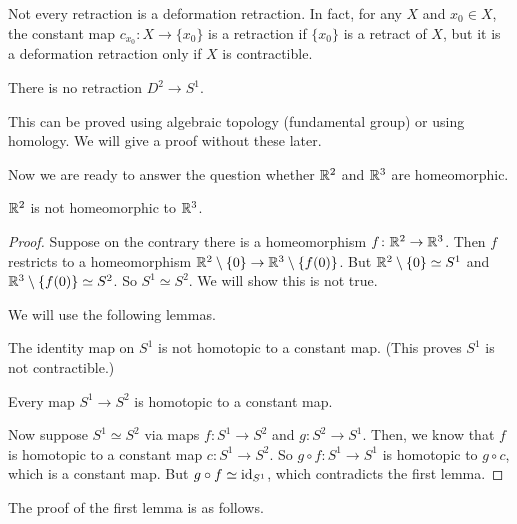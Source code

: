 \begin{example}
  Not every retraction is a deformation retraction. In fact, for any $X$ and $x_0\in X$, the constant map $c_{x_0}\colon X\to \{x_0\}$ is a retraction if $\{x_0\}$ is a retract of $X$, but it is a deformation retraction only if $X$ is contractible.
\end{example}

\begin{theorem}
  There is no retraction $D^2\to S^1$.
\end{theorem}

This can be proved using algebraic topology (fundamental group) or using homology. We will give a proof without these later.

Now we are ready to answer the question whether $\mathbb{R}^2$ and $\mathbb{R}^3$ are homeomorphic. 

\begin{theorem}
$\mathbb{R}^2$ is not homeomorphic to $\mathbb{R}^3$.
\end{theorem}

\begin{proof}
Suppose on the contrary there is a homeomorphism $f\colon \mathbb{R}^2\to \mathbb{R}^3$. Then $f$ restricts to a homeomorphism $\mathbb{R}^2\setminus\{0\}\to \mathbb{R}^3\setminus\{f(0)\}$. But $\mathbb{R}^2\setminus\{0\}\simeq S^1$ and $\mathbb{R}^3\setminus\{f(0)\}\simeq S^2$. So $S^1\simeq S^2$. We will show this is not true.

We will use the following lemmas.

\begin{lemma}\label{lem:circle-not-contractible}
  The identity map on $S^1$ is not homotopic to a constant map. (This proves $S^1$ is not contractible.)
\end{lemma}

\begin{lemma}\label{lem:sphere-contractible}
  Every map $S^1\to S^2$ is homotopic to a constant map.
\end{lemma}

Now suppose $S^1\simeq S^2$ via maps $f\colon S^1\to S^2$ and $g\colon S^2\to S^1$. Then, we know that $f$ is homotopic to a constant map $c:S^1\to S^2$. So $g\circ f:S^1\to S^1$ is homotopic to $g\circ c$, which is a constant map. But $g\circ f\simeq \text{id}_{S^1}$, which contradicts the first lemma.



\end{proof}

The proof of the first lemma is as follows.

